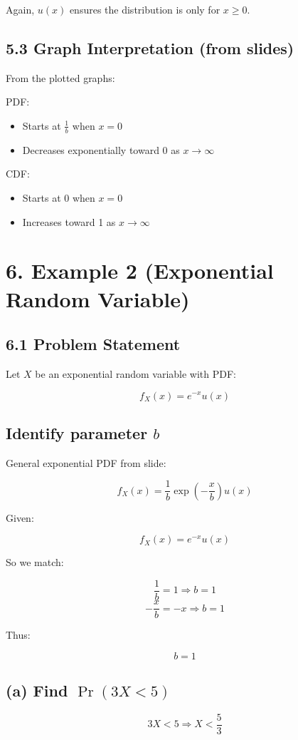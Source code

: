 \documentclass{article}
\begin{document}
Again, $u(x)$ ensures the distribution is only for $x\ge 0$.

\subsection*{5.3 Graph Interpretation (from slides)}
From the plotted graphs:

\noindent PDF:
\begin{itemize}
    \item Starts at $\frac{1}{b}$ when $x=0$
    \item Decreases exponentially toward 0 as $x\to\infty$
\end{itemize}

\noindent CDF:
\begin{itemize}
    \item Starts at 0 when $x=0$
    \item Increases toward 1 as $x\to\infty$
\end{itemize}


\section*{6. Example 2 (Exponential Random Variable)}

\subsection*{6.1 Problem Statement}
Let $X$ be an exponential random variable with PDF:

\[
f_X(x)=e^{-x}u(x)
\]

\subsection*{Identify parameter $b$}
General exponential PDF from slide:

\[
f_X(x)=\frac{1}{b}\exp\left(-\frac{x}{b}\right)u(x)
\]

Given:

\[
f_X(x)=e^{-x}u(x)
\]

So we match:

\[
\frac{1}{b}=1 \Rightarrow b=1
\]
\[
-\frac{x}{b}=-x \Rightarrow b=1
\]

Thus:

\[
b=1
\]

\subsection*{(a) Find $\Pr(3X<5)$}
\[
3X<5 \Rightarrow X<\frac{5}{3}
\]
\end{document}
